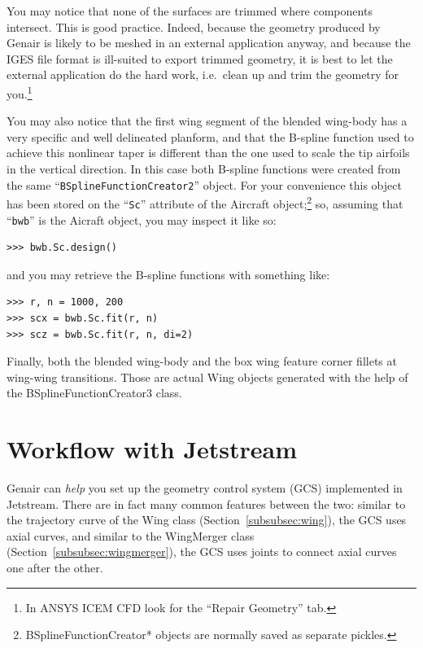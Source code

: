 \documentclass[]{article}
\begin{document}
You may notice that none of the surfaces are trimmed where components 
intersect.  This is good practice.  Indeed, because the geometry 
produced by Genair is likely to be meshed in an external application 
anyway, and because the IGES file format is ill-suited to export trimmed 
geometry, it is best to let the external application do the hard work, 
i.e.\ clean up and trim the geometry for you.\footnote{In ANSYS ICEM CFD 
look for the ``Repair Geometry'' tab.}

You may also notice that the first wing segment of the blended wing-body 
has a very specific and well delineated planform, and that the B-spline 
function used to achieve this nonlinear taper is different than the one 
used to scale the tip airfoils in the vertical direction.  In this case 
both B-spline functions were created from the same 
``\texttt{BSplineFunctionCreator2}'' object.  For your convenience this 
object has been stored on the ``\texttt{Sc}'' attribute of the Aircraft 
object;\footnote{BSplineFunctionCreator* objects are normally saved as 
separate pickles.} so, assuming that ``\texttt{bwb}'' is the Aicraft 
object, you may inspect it like so:
\begin{verbatim}
>>> bwb.Sc.design()
\end{verbatim}
and you may retrieve the B-spline functions with something like:
\begin{verbatim}
>>> r, n = 1000, 200
>>> scx = bwb.Sc.fit(r, n)
>>> scz = bwb.Sc.fit(r, n, di=2)
\end{verbatim}

Finally, both the blended wing-body and the box wing feature corner 
fillets at wing-wing transitions.  Those are actual Wing objects 
generated with the help of the BSplineFunctionCreator3 class.


\appendix


\newpage
\section{Workflow with Jetstream}
\label{app:jetstream}

Genair can \emph{help} you set up the geometry control system (GCS) 
implemented in Jetstream.  There are in fact many common features 
between the two: similar to the trajectory curve of the Wing class 
(Section~\ref{subsubsec:wing}), the GCS uses axial curves, and similar 
to the WingMerger class (Section~\ref{subsubsec:wingmerger}), the GCS 
uses joints to connect axial curves one after the other.
\end{document}
